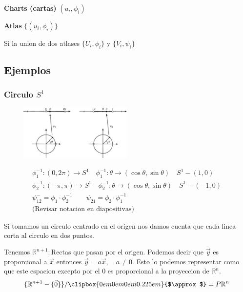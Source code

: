 \documentclass{article}
\newcommand{\caja}[3]{%
  \begin{tcolorbox}[colback=#1!5!white,colframe=#1!25!black,title=#2]
    #3
  \end{tcolorbox}%
}
\newcommand{\halfapprox}{\clipbox{0em 0em 0em 0.225em}{$\approx$}}
\begin{document}
\caja{black}{}{
  \textbf{Charts (cartas)} $ (u_i,\phi_i ) $

  \textbf{Atlas } $ \{(u_i,\phi_i )\} $
}

Si la union de dos atlases $ \{U_i, \phi_i \} $ y $ \{V_i,\psi_i \} $


\subsection{Ejemplos }
\subsubsection{Circulo $ S^1  $}
\begin{figure}[H]
  \begin{center}
    \includegraphics[width=0.5\textwidth]{circulo_s1.png}
  \end{center}
\end{figure}
\begin{gather*}
  \phi_1 ^ {-1 }: (0,2\pi) \rightarrow S^1 \quad \phi_1 ^ {-1 }: \theta \rightarrow (\cos{\theta}, \sin{\theta}) \quad S ^ {1 }-{(1,0)}\\
  \phi_2 ^ {-1 }: (-\pi, \pi ) \rightarrow S ^ {1 } \quad \phi _2 ^ {-1 }: \theta \rightarrow (\cos{\theta}, \sin{\theta}) \quad S ^ {1 }- {(-1,0)}\\ 
  \psi _{12 } ^- = \phi _1 \cdot \phi_ 2 ^ {-1 } \qquad \psi _{21 } = \phi_2 \cdot \phi _1 ^ {-1 } \\
  \text{(Revisar notacion en diapositivas)}
\end{gather*}

Si tomamos un circulo centrado en el origen nos damos cuenta que cada linea corta al circulo en dos puntos.

Tenemos $ \mathbb{R}^ {n+ 1 }:  $Rectas que pasan por el origen. Podemos decir que $ \vec y  $ es proporcional a $ \vec x  $ entonces $ \vec y = a \vec x, \quad a \neq 0  $. Esto lo podemos representar como que este espacion excepto por el 0 es proporcional a la proyeccion de $ \mathbb{R}^ {n } $.
\begin{gather*}
  \{\mathbb{R}^ {n+1 } - \{\vec 0 \}\} / \halfapprox = P \mathbb{R}^ {n }
\end{gather*}
\end{document}
